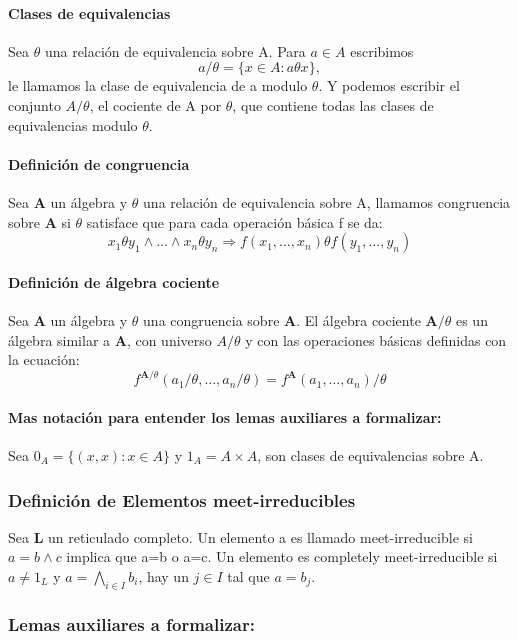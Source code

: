 \documentclass{article}
\begin{document}
\paragraph{Clases de equivalencias}
Sea $\theta$ una relación de equivalencia sobre A. Para $a \in A$ escribimos
\[ a / \theta = \{ x \in A \colon a \theta x \}, \]
le llamamos la clase de equivalencia de a modulo $\theta$. Y podemos escribir el conjunto $A/ \theta$, el cociente de A por $\theta$, que contiene todas las clases de equivalencias modulo $\theta$.

\paragraph{Definición de congruencia}
Sea \textbf{A} un álgebra y $\theta$ una relación de equivalencia sobre A, llamamos congruencia sobre \textbf{A} si $\theta$ satisface que para cada operación básica f se da: 
\[ x_1 \theta y_1 \land \dots \land x_n \theta y_n \Rightarrow f(x_1, \dots, x_n) \theta f(y_1, \dots, y_n)\]

\paragraph{Definición de álgebra cociente}
Sea \textbf{A} un álgebra y $\theta$ una congruencia sobre \textbf{A}. El álgebra cociente $\textbf{A}/\theta$ es un álgebra similar a \textbf{A}, con universo $A/\theta$ y con las operaciones básicas definidas con la ecuación:
\[f^{\textbf{A}/\theta}(a_1/\theta,\dots,a_n/\theta) = f^{\textbf{A}}(a_1,\dots,a_n)/\theta\]

\paragraph{Mas notación para entender los lemas auxiliares a formalizar:}
Sea $0_A = \{(x,x) \colon x \in A\}$ y $1_A = A \times A$, son clases de equivalencias sobre A.

\subsubsection{Definición de Elementos meet-irreducibles}
Sea \textbf{L} un reticulado completo. Un elemento a es llamado meet-irreducible si $a = b\land c$ implica que a=b o a=c. Un elemento es completely meet-irreducible si $a\neq 1_L$ y $a = \bigwedge_{i \in I} b_i$, hay un $j \in I$ tal que $a = b_j$. 
\subsubsection{Lemas auxiliares a formalizar:}
\end{document}
